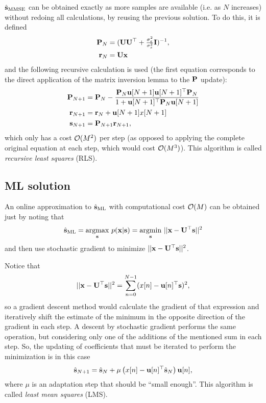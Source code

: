 $\hat{{\mathbf s}}_\text{MMSE}$ can be obtained exactly as more samples are available (i.e. as $N$ increases) without redoing all calculations, by reusing the previous solution. To do this, it is defined
\begin{align}
{\mathbf P}_N &= ({\mathbf U} {\mathbf U}^\top + \tfrac{\sigma_\varepsilon^2}{\sigma_s^2}{\mathbf I})^{-1}, \\ {\mathbf r}_N &= {\mathbf U} {\mathbf x}
\end{align}
and the following recursive calculation is used (the first equation corresponds to the direct application of the matrix inversion lemma to the ${\mathbf P}$ update):
\begin{align*}
{\mathbf P}_{N+1} 
	&= {\mathbf P}_N -\frac{{\mathbf P}_N{\mathbf u}[N+1]{\mathbf u}[N+1]^\top 
	   {\mathbf P}_N}{1  +{\mathbf u}[N+1]^\top  {\mathbf P}_N{\mathbf u}[N+1]}  \\
{\mathbf r}_{N+1} 
    &= {\mathbf r}_N  +{\mathbf u}[N+1] x[N+1] \\
{\mathbf s}_{N+1}
    &= {\mathbf P}_{N+1}{\mathbf r}_{N+1} ,
\end{align*}
which only has a cost ${\mathcal O}(M^2)$ per step (as opposed to applying the complete original equation at each step, which would cost ${\mathcal O}(M^3) $). This algorithm is called \emph{recursive least squares} (RLS).

\subsection{ML solution}

An online approximation to $\hat{{\mathbf s}}_\text{ML}$ with computational cost ${\mathcal O}(M)$ can be obtained just by noting that
\begin{equation}
\hat{{\mathbf s}}_\text{ML} = \underset{{\mathbf s}}{\operatorname{argmax}}~ p({\mathbf x}|{\mathbf s}) =  \underset{{\mathbf s}}{\operatorname{argmin}}~ ||{\mathbf x} - {\mathbf U}^\top{\mathbf s}||^2
\end{equation}
and then use stochastic gradient to minimize $||{\mathbf x} - {\mathbf U}^\top {\mathbf s} ||^2$.

Notice that
\begin{equation}
||{\mathbf x} - {\mathbf U}^\top{\mathbf s}||^2 = \sum_{n=0}^{N-1} (x[n] - {\mathbf u}[n]^\top{\mathbf s})^2,
\end{equation}
so a gradient descent method would calculate the gradient of that expression and iteratively shift the estimate of the minimum in the opposite direction of the gradient in each step. A descent by stochastic gradient performs the same operation, but considering only one of the additions of the mentioned sum in each step. So,
the updating of coefficients that must be iterated to perform the minimization is in this case
\begin{equation}
\hat{{\mathbf s}}_{N+1} = \hat{{\mathbf s}}_N + \mu \left(x[n] - {\mathbf u}[n]^\top \hat{{\mathbf s}}_N\right){\mathbf u}[n],
\end{equation}
where $\mu$ is an adaptation step that should be ``small enough''. This algorithm is called \emph{least mean squares} (LMS).

